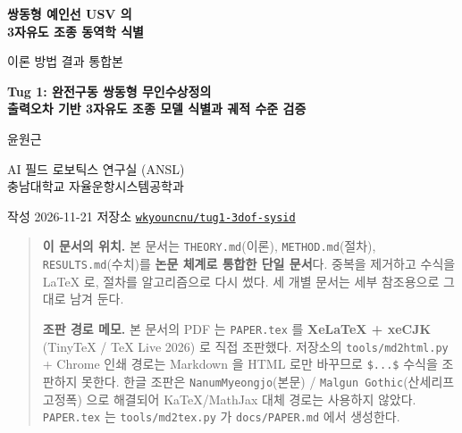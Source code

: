 \documentclass[10pt,a4paper]{article}
\begin{document}
\begin{center}
{\LARGE\bfseries 쌍동형 예인선 USV 의\\[2pt]
3자유도 조종 동역학 식별\par}
\vspace{6pt}
{\large 이론 \textperiodcentered{} 방법 \textperiodcentered{} 결과 통합본\par}
\vspace{14pt}
{\normalsize\bfseries Tug 1: 완전구동 쌍동형 무인수상정의\\[2pt]
출력오차 기반 3자유도 조종 모델 식별과 궤적 수준 검증\par}
\vspace{16pt}
{\normalsize 윤원근\par}
{\small AI 필드 로보틱스 연구실 (ANSL)\\
충남대학교 자율운항시스템공학과\par}
\vspace{10pt}
{\small 작성 2026-11-21 \textperiodcentered{} 저장소
\href{https://github.com/wkyouncnu/tug1-3dof-sysid}{\texttt{wkyouncnu/tug1-3dof-sysid}}\par}
\end{center}

\vspace{4pt}

\begin{quote}\small
\textbf{이 문서의 위치.} 본 문서는 \texttt{THEORY.md}(이론), \texttt{METHOD.md}(절차),
\texttt{RESULTS.md}(수치)를 \textbf{논문 체계로 통합한 단일 문서}다. 중복을 제거하고
수식을 LaTeX 로, 절차를 알고리즘으로 다시 썼다. 세 개별 문서는 세부 참조용으로 그대로 남겨 둔다.

\textbf{조판 경로 메모.} 본 문서의 PDF 는 \texttt{PAPER.tex} 를 \textbf{XeLaTeX + xeCJK}
(TinyTeX / TeX Live 2026) 로 직접 조판했다. 저장소의 \texttt{tools/md2html.py} + Chrome 인쇄
경로는 Markdown 을 HTML 로만 바꾸므로 \texttt{\$...\$} 수식을 조판하지 못한다. 한글 조판은
\texttt{NanumMyeongjo}(본문) / \texttt{Malgun Gothic}(산세리프 \textperiodcentered{} 고정폭)
으로 해결되어 KaTeX/MathJax 대체 경로는 사용하지 않았다. \texttt{PAPER.tex} 는
\texttt{tools/md2tex.py} 가 \texttt{docs/PAPER.md} 에서 생성한다.
\end{quote}

\vspace{6pt}
{\small\tableofcontents}
\clearpage
\end{document}
